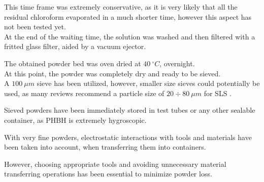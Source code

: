 \documentclass{article}
\begin{document}
        This time frame was extremely conservative, as it is very likely that all the residual chloroform 
        evaporated in a much shorter time, however this aspect has not been tested yet. \\

        At the end of the waiting time, the solution was washed and then filtered with a fritted glass filter, aided by a vacuum 
        ejector. 

%

        The obtained powder bed was oven dried at $40 \ ^{\circ}C$, overnight. \\ 

        At this point, the powder was completely dry and ready to be sieved. \\ 

        A $100 \ \mu m$ sieve has been utilized, however, smaller size sieves could potentially be used, as many reviews recommend a particle 
        size of $20 \div 80 \ \mu m$ for SLS \autocites{Padovano_SLS_Review}. 
        
%

        Sieved powders have been immediately stored in test tubes or any other sealable container, as PHBH is extremely hygroscopic. 

        With very fine powders, electrostatic interactions with tools and materials have been taken into account, when transferring 
        them into containers. 


        However, choosing appropriate tools and avoiding unnecessary material transferring operations has been essential to minimize powder loss. 

\end{document}
